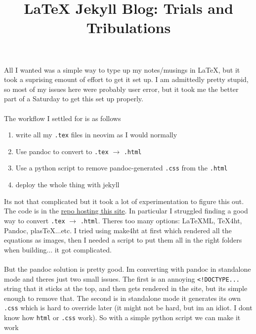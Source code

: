 \documentclass[11pt]{article}
\title{LaTeX Jekyll Blog: Trials and Tribulations}
\begin{document}
\maketitle
All I wanted was a simple way to type up my notes/musings in LaTeX, but it took a suprising emount of effort to get it set up.
I am admittedly pretty stupid, so most of my issues here were probably user error, but it took me the better part of a Saturday
to get this set up properly.
\\\\
The workflow I settled for is as follows
\begin{enumerate}
    \item write all my \texttt{.tex} files in neovim as I would normally
    \item Use pandoc to convert to \texttt{.tex} $\rightarrow$ \texttt{.html}
    \item Use a python script to remove pandoc-generated \texttt{.css} from the \texttt{.html}
    \item deploy the whole thing with jekyll
\end{enumerate}
Its not that complicated but it took a lot of experimentation to figure this out. The code is in the \href{https://github.com/sammy-snipes/sammy-snipes.github.io}{repo hosting this site}. In particular I struggled finding a good way to convert \texttt{.tex}  $\rightarrow$ \texttt{.html}. Theres too many options: LaTeXML, TeX4ht, Pandoc, plasTeX...etc. I tried using make4ht at first which rendered all the equations as images, then I needed a script to put them all in the right folders when building... it got complicated. 
\\\\ 
But the pandoc solution is pretty good. Im converting with pandoc in standalone mode and theres
just two small issues. The first is an annoying \texttt{<!DOCTYPE...} string that it sticks
at the top, and then gets rendered in the site, but its simple enough to remove that. 
The second is in standalone mode it generates its own \texttt{.css} which is hard to 
override later (it might not be hard, but im an idiot. I dont know how \texttt{html} or \texttt{.css} work). So with a simple python script we can make it work 
\end{document}
